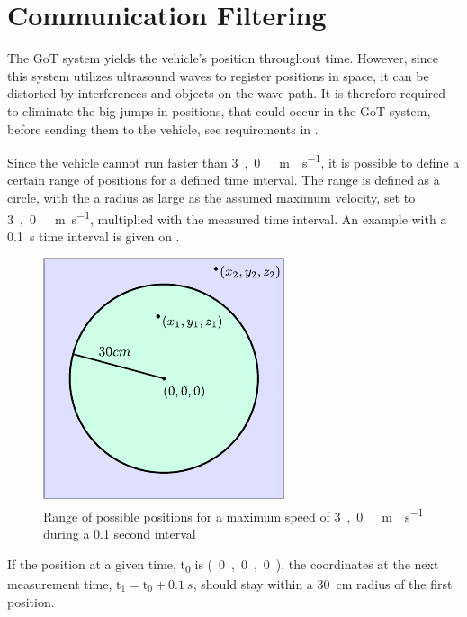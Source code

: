 \section{Communication Filtering}
The GoT system yields the vehicle's position throughout time. However, since this system utilizes ultrasound waves to register positions in space, it can be distorted by interferences and objects on the wave path. It is therefore required to eliminate the big jumps in positions, that could occur in the GoT system, before sending them to the vehicle, see requirements in .

Since the vehicle cannot run faster than \si{3,0\ m \cdot s^{-1}}, it is possible to define a certain range of positions for a defined time interval. The range is defined as a circle, with the a radius as large as the assumed maximum velocity, set to \si{3,0\ m.s^{-1}}, multiplied with the measured time interval. An example with a \SI{0,1}{s} time interval is given on .
%
\begin{figure}[H]
  \centering
  \includegraphics[scale=1.3]{figures/GoTFilterSimple.pdf}
  \caption{Range of possible positions for a maximum speed of \si{3,0\ m \cdot s^{-1}} during a \SI{0,1}{} second interval}
  \label{GoTFilterSimple}
\end{figure}
%
If the position at a given time, \si{t_0} is \si{(0,0,0)}, the coordinates at the next measurement time, $\text{t}_1 = \text{t}_0+\SI{0,1}{s}$, should stay within a \SI{30}{cm} radius of the first position.

